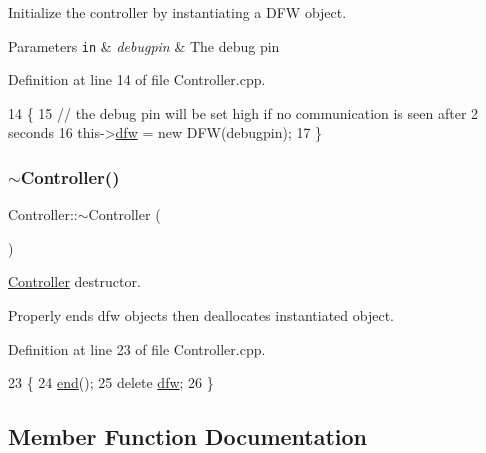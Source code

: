 Initialize the controller by instantiating a D\+FW object. 


\begin{DoxyParams}[1]{Parameters}
\mbox{\tt in}  & {\em debugpin} & The debug pin \\
\hline
\end{DoxyParams}


Definition at line 14 of file Controller.\+cpp.


\begin{DoxyCode}
14                                    \{
15     \textcolor{comment}{// the debug pin will be set high if no communication is seen after 2 seconds}
16     this->\hyperlink{class_controller_af4793ccbf2ecdbfcdb9359bd32b6e8cf}{dfw} = \textcolor{keyword}{new} DFW(debugpin);
17 \}
\end{DoxyCode}
\mbox{\label{class_controller_a0ab87934c4f7a266cfdb86e0f36bc1b5}} 
\subsubsection{\texorpdfstring{$\sim$\+Controller()}{~Controller()}}
{\footnotesize\ttfamily Controller\+::$\sim$\+Controller (\begin{DoxyParamCaption}{ }\end{DoxyParamCaption})}



\hyperlink{class_controller}{Controller} destructor. 

Properly ends dfw objects then deallocates instantiated object. 

Definition at line 23 of file Controller.\+cpp.


\begin{DoxyCode}
23                         \{
24     \hyperlink{class_controller_a7cdeade73d459b6a3279b9d0e2598117}{end}();
25     \textcolor{keyword}{delete} \hyperlink{class_controller_af4793ccbf2ecdbfcdb9359bd32b6e8cf}{dfw};
26 \}
\end{DoxyCode}


\subsection{Member Function Documentation}
\mbox{\label{class_controller_a338cdce0f0f662c96fd2d76b7733736a}} 
